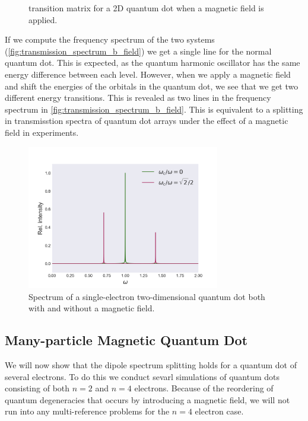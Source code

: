 \begin{figure}
\begin{center}
\begin{minipage}{0.4\textwidth}
        \caption{transition matrix for a 2D quantum dot when a magnetic field
            is applied.}
        \label{fig:transition_yes_b}
    \end{minipage}        
    \end{center}
\end{figure}

If we compute the frequency spectrum of the two systems
(\autoref{fig:transmission_spectrum_b_field}) we get a single line for the 
normal quantum dot. This is expected, as the quantum harmonic oscillator has 
the same energy difference between each level. However, when we apply a magnetic
field and shift the energies of the orbitals in the quantum dot, we see that we 
get two different energy transitions. This is revealed as two lines in the 
frequency spectrum in \autoref{fig:transmission_spectrum_b_field}. This is equivalent 
to a splitting in transmisstion spectra of quantum dot arrays under the effect 
of a magnetic field in experiments\cite{heitmann1993spectroscopy,meurer1992single}.

\begin{figure}
    \centering
    \includegraphics[width=0.75\textwidth]{results/figures/transmission_spectrum.png}
    \caption{Spectrum of a single-electron two-dimensional quantum dot both with and
        without a magnetic field.
    }
    \label{fig:transmission_spectrum_b_field}
\end{figure}

\subsection{Many-particle Magnetic Quantum Dot}

We will now show that the dipole spectrum splitting holds for a quantum dot of 
several electrons. To do this we conduct sevarl simulations of quantum dots consisting 
of both $n=2$ and $n=4$ electrons. Because of the reordering of quantum degeneracies 
that occurs by introducing a magnetic field, we will not run into any multi-reference 
problems for the $n=4$ electron case.


